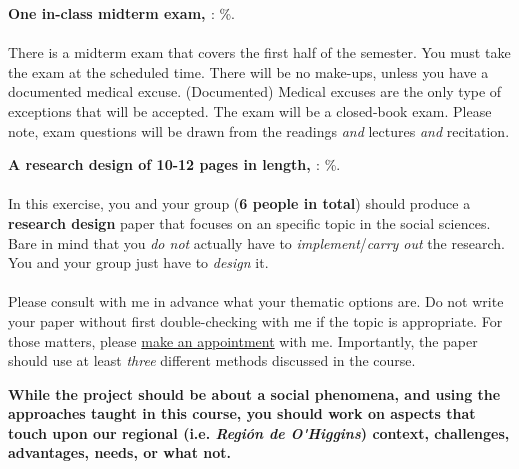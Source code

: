 \documentclass[letterpaper]{article}
\renewenvironment{itemize}{
  \begin{list}{}{
    \setlength{\leftmargin}{1.5em}
  }
}{
  \end{list}
}
\begin{document}
\begin{enumerate}
	\item {\bf One in-class midterm exam, \underline{{\unskip}}}: {\unskip}\%.
	\\ 
	\\
	There is a midterm exam that covers the first half of the semester. You must take the exam at the scheduled time. There will be no make-ups, unless you have a documented medical excuse. (Documented) Medical excuses are the only type of exceptions that will be accepted. The exam will be a closed-book exam. Please note, exam questions will be drawn from the readings \emph{and} lectures \emph{and} recitation.


	\item {\bf A research design of 10-12 pages in length, \underline{{\unskip}}}: {\unskip}\%.
	\\ 
	\\
	In this exercise, you and your group ({\bf 6 people in total}) should produce a {\bf research design} paper that focuses on an specific topic in the social sciences. Bare in mind that you \emph{do not} actually have to \emph{implement}/\emph{carry out} the research. You and your group just have to \emph{design} it.
	\\
	\\
	Please consult with me in advance what your thematic options are. Do not write your paper without first double-checking with me if the topic is appropriate. For those matters, please \href{https://calendly.com/bahamonde/officehours}{make an appointment} with me. Importantly, the paper should use at least \emph{three} different methods discussed in the course.

	\begin{itemize}
	\item[\Pointinghand] {\bf While the project should be about a social phenomena, and using the approaches taught in this course, {\color{blue}you should work on aspects that touch upon our regional} (i.e. \emph{Regi\'on de O\'\unskip Higgins}) {\color{blue}context, challenges, advantages, needs, or what not.}}
	\end{itemize}


\end{enumerate}
\end{document}
